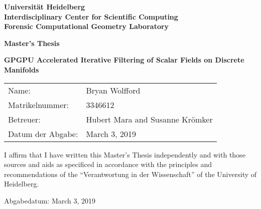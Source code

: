 %

%
\frontmatter

\begin{titlepage}

\vspace*{1cm}
\begin{center}
\vspace*{3cm}
\textbf{
\Large Universität Heidelberg\\
\smallskip
\Large Interdisciplinary Center for Scientific Computing\\
\smallskip
\Large Forensic Computational Geometry Laboratory\\
\smallskip
}

\vspace{3cm}

\textbf{\large Master's Thesis} %

\vspace{0.5\baselineskip}
{\huge
\textbf{GPGPU Accelerated Iterative Filtering of Scalar Fields on Discrete Manifolds}
}
\end{center}

\vfill

{\large
\begin{tabular}[l]{ll}
Name: & Bryan Wolfford\\
Matrikelnummer: & 3346612\\
Betreuer: & Hubert Mara and Susanne Krömker\\
Datum der Abgabe: & March 3, 2019
\end{tabular}
}

\end{titlepage}


\thispagestyle{empty}

\vspace*{100pt}
\noindent
I affirm that I have written this Master's Thesis independently and with those sources and aids as specificed in accordance with the principles and
recommendations of the ``Verantwortung in der Wissenschaft'' of the University of Heidelberg.

\vspace*{50pt}
\noindent

\underline{\phantom{mmmmmmmmmmmmmmmmmmmm}}

\medskip
\noindent
Abgabedatum: March 3, 2019
\newpage

%

